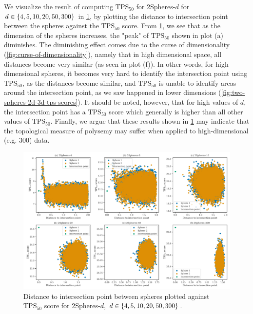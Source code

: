 We visualize the result of computing $\text{TPS}_{50}$ for 2Spheres-$d$ for $d \in \left\{4, 5, 10, 20, 50, 300\right\}$ in \cref{fig:two-spheres-distance-to-int-point-vs-tps-scores}, by plotting the distance to intersection point between the spheres against the $\text{TPS}_{50}$ score. From \cref{fig:two-spheres-distance-to-int-point-vs-tps-scores}, we see that as the dimension of the spheres increases, the "peak" of $\text{TPS}_{50}$ shown in plot (a) diminishes. The diminishing effect comes due to the curse of dimensionality (\cref{fig:curse-of-dimensionality}), namely that in high dimensional space, all distances become very similar (as seen in plot (f)). In other words, for high dimensional spheres, it becomes very hard to identify the intersection point using $\text{TPS}_{50}$, as the distances become similar, and $\text{TPS}_{50}$ is unable to identify areas around the intersection point, as we saw happened in lower dimensions (\cref{fig:two-spheres-2d-3d-tps-scores}). It should be noted, however, that for high values of $d$, the intersection point has a $\text{TPS}_{50}$ score which generally is higher than all other values of $\text{TPS}_{50}$. Finally, we argue that these results shown in \cref{fig:two-spheres-distance-to-int-point-vs-tps-scores} may indicate that the topological measure of polysemy may suffer when applied to high-dimensional (e.g. 300) data.
\begin{figure}[H]
    \centering
    \includegraphics[width=\textwidth]{thesis/figures/two-spheres-distance-to-int-point-vs-tps-scores.pdf}
    \caption{Distance to intersection point between spheres plotted against $\text{TPS}_{50}$ score for 2Spheres-$d$, $d \in \left\{4, 5, 10, 20, 50, 300\right\}$.}
    \label{fig:two-spheres-distance-to-int-point-vs-tps-scores}
\end{figure}


